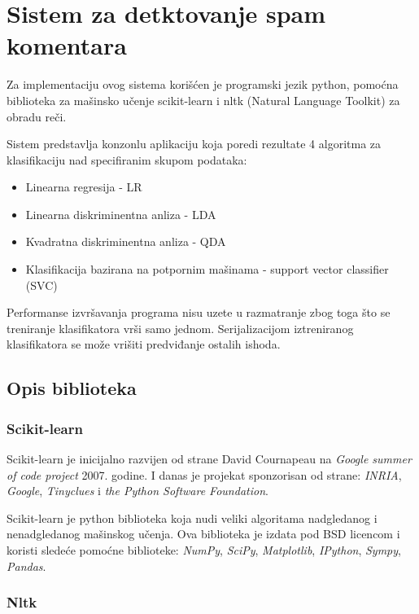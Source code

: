 \section{Sistem za detktovanje spam komentara}

Za implementaciju ovog sistema korišćen je programski jezik python, pomoćna biblioteka za mašinsko učenje
scikit-learn i nltk (Natural Language Toolkit) za obradu reči.

Sistem predstavlja konzonlu aplikaciju koja poredi rezultate 4
algoritma za klasifikaciju nad specifiranim skupom podataka:
\begin{itemize}
  \item Linearna regresija - LR
  \item Linearna diskriminentna anliza - LDA
  \item Kvadratna diskriminentna anliza - QDA
  \item Klasifikacija bazirana na potpornim mašinama - support vector classifier (SVC)
\end{itemize}

Performanse izvršavanja programa nisu uzete u razmatranje zbog toga što se
treniranje klasifikatora vrši samo jednom. Serijalizacijom iztreniranog klasifikatora
se može vrišiti predviđanje ostalih ishoda.

\subsection{Opis biblioteka}
\subsubsection{Scikit-learn}

Scikit-learn je inicijalno razvijen od strane David Cournapeau na \textit{Google summer of code project} 2007. godine.
I danas je projekat sponzorisan od strane: \textit{INRIA}, \textit{Google}, \textit{Tinyclues} i \textit{the Python Software Foundation}.

Scikit-learn je python biblioteka koja nudi veliki algoritama nadgledanog i nenadgledanog mašinskog učenja.
Ova biblioteka je izdata pod BSD licencom i koristi sledeće pomoćne biblioteke: \textit{NumPy}, \textit{SciPy}, \textit{Matplotlib}, \textit{IPython}, \textit{Sympy}, \textit{Pandas}.

\subsubsection{Nltk}

